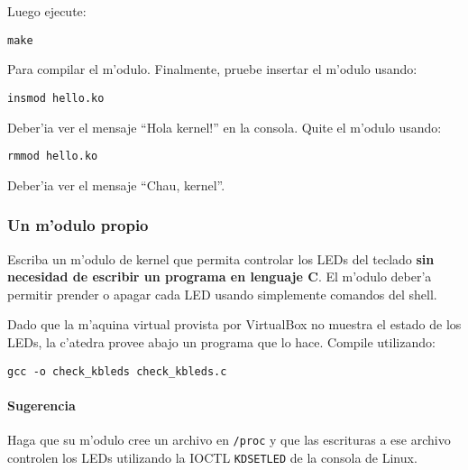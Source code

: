 
Luego ejecute:

\texttt{make}

Para compilar el m'odulo. Finalmente, pruebe insertar el m'odulo usando:

\texttt{insmod hello.ko}

Deber'ia ver el mensaje ``Hola kernel!'' en la consola. Quite el m'odulo usando:

\texttt{rmmod hello.ko}

Deber'ia ver el mensaje ``Chau, kernel''.

\subsubsection{Un m'odulo propio}

Escriba un m'odulo de kernel que permita controlar los LEDs del teclado \textbf{sin necesidad de escribir un programa 
en lenguaje C}. El m'odulo deber'a permitir prender o apagar cada LED usando simplemente comandos del shell.

Dado que la m'aquina virtual provista por VirtualBox no muestra el estado de los LEDs, la c'atedra provee abajo
un programa que lo hace. Compile utilizando:

\texttt{gcc -o check\_kbleds check\_kbleds.c}


\paragraph{Sugerencia}

Haga que su m'odulo cree un archivo en \texttt{/proc} y que las escrituras a ese archivo controlen los LEDs utilizando 
la IOCTL \texttt{KDSETLED} de la consola de Linux.
